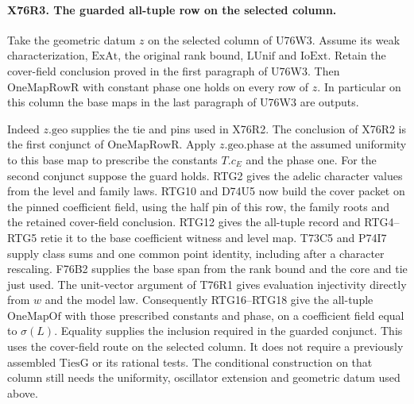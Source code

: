 \paragraph{X76R3. The guarded all-tuple row on the selected column.}
Take the geometric datum $z$ on the selected column of U76W3.
Assume its weak characterization, $\mathrm{ExAt}$, the original
rank bound, $\mathrm{LUnif}$ and $\mathrm{IoExt}$. Retain the
cover-field conclusion proved in the first paragraph of U76W3.
Then $\mathrm{OneMapRowR}$ with constant phase one holds on every
row of $z$. In particular on this column the base maps in the
last paragraph of U76W3 are outputs.

Indeed $z.\mathrm{geo}$ supplies the tie and pins used in X76R2.
The conclusion of X76R2 is the first conjunct of
$\mathrm{OneMapRowR}$. Apply $z.\mathrm{geo.phase}$ at the
assumed uniformity to this base map to prescribe the constants
$T.c_E$ and the phase one. For the second conjunct suppose the
guard holds. RTG2 gives the adelic character values from the
level and family laws. RTG10 and D74U5 now build the cover
packet on the pinned coefficient field, using the half pin of
this row, the family roots and the retained cover-field conclusion.
RTG12 gives the all-tuple record and RTG4--RTG5 retie it to
the base coefficient witness and level map. T73C5 and P74I7
supply class sums and one common point identity, including after
a character rescaling. F76B2 supplies the base span from the
rank bound and the core and tie just used. The unit-vector
argument of T76R1 gives evaluation injectivity directly from
$w$ and the model law. Consequently RTG16--RTG18 give the
all-tuple $\mathrm{OneMapOf}$ with those prescribed constants
and phase, on a coefficient field equal to $\sigma(L)$. Equality
supplies the inclusion required in the guarded conjunct. This
uses the cover-field route on the selected column. It does not
require a previously assembled $\mathrm{TiesG}$ or its rational
tests. The conditional construction on that column still needs
the uniformity, oscillator extension and geometric datum used
above.
